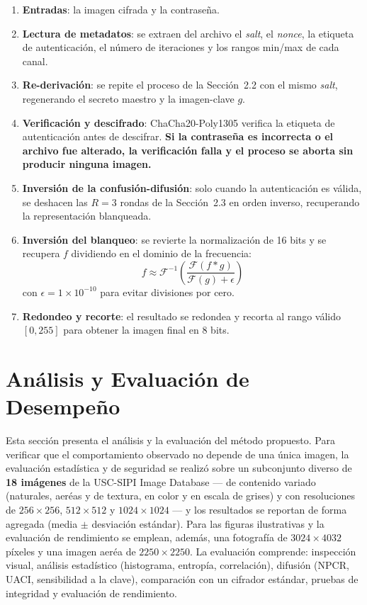 \documentclass{llncs}
\begin{document}
\begin{enumerate}
  \item \textbf{Entradas}: la imagen cifrada y la contrase\~na.
  \item \textbf{Lectura de metadatos}: se extraen del archivo el
    \emph{salt}, el \emph{nonce}, la etiqueta de autenticaci\'on, el
    n\'umero de iteraciones y los rangos min/max de cada canal.
  \item \textbf{Re-derivaci\'on}: se repite el proceso de la Secci\'on~2.2
    con el mismo \emph{salt}, regenerando el secreto maestro y la
    imagen-clave $g$.
  \item \textbf{Verificaci\'on y descifrado}: ChaCha20-Poly1305 verifica la
    etiqueta de autenticaci\'on antes de descifrar. \textbf{Si la
    contrase\~na es incorrecta o el archivo fue alterado, la verificaci\'on
    falla y el proceso se aborta sin producir ninguna imagen.}
  \item \textbf{Inversi\'on de la confusi\'on-difusi\'on}: solo cuando la
    autenticaci\'on es v\'alida, se deshacen las $R=3$ rondas de la
    Secci\'on~2.3 en orden inverso, recuperando la representaci\'on
    blanqueada.
  \item \textbf{Inversi\'on del blanqueo}: se revierte la normalizaci\'on de
    16 bits y se recupera $f$ dividiendo en el dominio de la frecuencia:
    \[
    f \approx \mathcal{F}^{-1}\left(\frac{\mathcal{F}(f * g)}{\mathcal{F}(g) + \epsilon}\right)
    \]
    con $\epsilon = 1\times10^{-10}$ para evitar divisiones por cero.
  \item \textbf{Redondeo y recorte}: el resultado se redondea y recorta al
    rango v\'alido $[0,255]$ para obtener la imagen final en 8 bits.
\end{enumerate}

\section{An\'alisis y Evaluaci\'on de Desempe\~no}

Esta secci\'on presenta el an\'alisis y la evaluaci\'on del m\'etodo
propuesto. Para verificar que el comportamiento observado no depende de una
\'unica imagen, la evaluaci\'on estad\'istica y de seguridad se realiz\'o
sobre un subconjunto diverso de \textbf{18 im\'agenes} de la USC-SIPI Image
Database \cite{sipi} --- de contenido variado (naturales, aer\'eas y de
textura, en color y en escala de grises) y con resoluciones de
$256\times256$, $512\times512$ y $1024\times1024$ --- y los resultados se
reportan de forma agregada (media $\pm$ desviaci\'on est\'andar). Para las
figuras ilustrativas y la evaluaci\'on de rendimiento se emplean, adem\'as,
una fotograf\'ia de $3024\times4032$ p\'ixeles y una imagen aer\'ea de
$2250\times2250$. La evaluaci\'on comprende: inspecci\'on visual, an\'alisis
estad\'istico (histograma, entrop\'ia, correlaci\'on), difusi\'on (NPCR,
UACI, sensibilidad a la clave), comparaci\'on con un cifrador est\'andar,
pruebas de integridad y evaluaci\'on de rendimiento.
\end{document}
